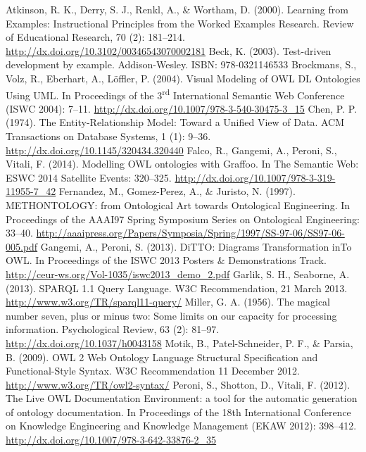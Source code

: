 \documentclass[runningheads,a4paper]{llncs}
\begin{document}
\begin{thebibliography}{4}

 Atkinson, R. K., Derry, S. J., Renkl, A., \& Wortham, D. (2000). Learning from Examples: Instructional Principles from the Worked Examples Research. Review of Educational Research, 70 (2): 181--214. \url{http://dx.doi.org/10.3102/00346543070002181}
 Beck, K. (2003). Test-driven development by example. Addison-Wesley. ISBN: 978-0321146533
 Brockmans, S., Volz, R., Eberhart, A., Löffler, P. (2004). Visual Modeling of OWL DL Ontologies Using UML. In Proceedings of the 3\textsuperscript{rd} International Semantic Web Conference (ISWC 2004): 7--11. \url{http://dx.doi.org/10.1007/978-3-540-30475-3\_15}
 Chen, P. P. (1974). The Entity-Relationship Model: Toward a Unified View of Data. ACM Transactions on Database Systems, 1 (1): 9--36. \url{http://dx.doi.org/10.1145/320434.320440}
 Falco, R., Gangemi, A., Peroni, S., Vitali, F. (2014). Modelling OWL ontologies with Graffoo. In The Semantic Web: ESWC 2014 Satellite Events: 320--325. \url{http://dx.doi.org/10.1007/978-3-319-11955-7\_42}
 Fernandez, M., Gomez-Perez, A., \& Juristo, N. (1997). METHONTOLOGY: from Ontological Art towards Ontological Engineering. In Proceedings of the AAAI97 Spring Symposium Series on Ontological Engineering: 33--40. \url{http://aaaipress.org/Papers/Symposia/Spring/1997/SS-97-06/SS97-06-005.pdf}
 Gangemi, A., Peroni, S. (2013). DiTTO: Diagrams Transformation inTo OWL. In Proceedings of the ISWC 2013 Posters \& Demonstrations Track. \url{http://ceur-ws.org/Vol-1035/iswc2013\_demo\_2.pdf}
 Garlik, S. H., Seaborne, A. (2013). SPARQL 1.1 Query Language. W3C Recommendation, 21 March 2013. \url{http://www.w3.org/TR/sparql11-query/}
 Miller, G. A. (1956). The magical number seven, plus or minus two: Some limits on our capacity for processing information. Psychological Review, 63 (2): 81--97. \url{http://dx.doi.org/10.1037/h0043158}
 Motik, B., Patel-Schneider, P. F., \& Parsia, B. (2009). OWL 2 Web Ontology Language Structural Specification and Functional-Style Syntax. W3C Recommendation 11 December 2012. \url{http://www.w3.org/TR/owl2-syntax/}
 Peroni, S., Shotton, D., Vitali, F. (2012). The Live OWL Documentation Environment: a tool for the automatic generation of ontology documentation. In Proceedings of the 18th International Conference on Knowledge Engineering and Knowledge Management (EKAW 2012): 398--412. \url{http://dx.doi.org/10.1007/978-3-642-33876-2\_35}

\end{thebibliography}
\end{document}
